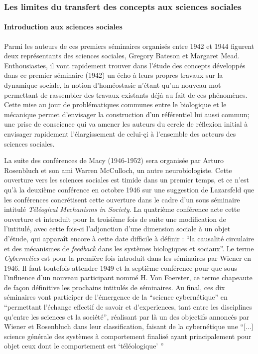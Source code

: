 \subsubsection{ Les limites du transfert des concepts aux sciences sociales}

\paragraph{Introduction aux sciences sociales}
Parmi les auteurs de ces premiers séminaires organisés entre 1942 et 1944 figurent deux représentants des sciences sociales, Gregory Bateson et Margaret Mead. Enthousiastes, il vont rapidement trouver dans l'étude des concepts développés dans ce premier séminaire (1942) un écho à leurs propres travaux sur la dynamique sociale, la notion d'homéostasie n'étant qu'un nouveau mot permettant de rassembler des travaux existants déjà au fait de ces phénomènes. Cette mise au jour de problématiques communes entre le biologique et le mécanique permet d'envisager la construction d'un référentiel lui aussi commun; une prise de conscience qui va amener les auteurs du cercle de réflexion initial à envisager rapidement l'élargissement de celui-çi à l'ensemble des acteurs des sciences sociales.

La suite des conférences de Macy (1946-1952) sera organisée par Arturo Rosenbluch et son ami Warren McCulloch, un autre neurobiologiste. Cette ouverture vers les sciences sociales est timide dans un premier temps, et ce n'est qu'à la deuxième conférence en octobre 1946 sur une suggestion de Lazarsfeld que les conférences concrétisent cette ouverture dans le cadre d'un sous séminaire intitulé \textit{Téléogical Mechanisms in Society}. La quatrième conférence acte cette ouverture et introduit pour la troisième fois de suite une modification de l'intitulé, avec cette fois-ci l'adjonction d'une dimension sociale à un objet d'étude, qui apparaît encore à cette date difficile à définir : \enquote{la causalité circulaire et des mécanismes de \textit{feedback} dans les systèmes biologiques et sociaux}. Le terme \textit{Cybernetics} est pour la première fois introduit dans les séminaires par Wiener en 1946. Il faut toutefois attendre 1949 et la septième conférence pour que sous l'influence d'un nouveau participant nommé H. Von Foerster, ce terme chapeaute de façon définitive les prochains intitulés de séminaires. Au final, ces dix séminaires vont participer de l'émergence de la \enquote{science cybernétique} en \enquote{permettant l'échange effectif de savoir et d'experiences, tant entre les disciplines qu'entre les sciences et la société}, réalisant par là un des objectifs annoncés par Wiener et Rosenbluch dans leur classification, faisant de la cybernétique une \enquote{[...] science générale des systèmes à comportement finalisé ayant principalement pour objet ceux dont le comportement est \enquote{téléologique} } \autocite{Pouvreau2013}

